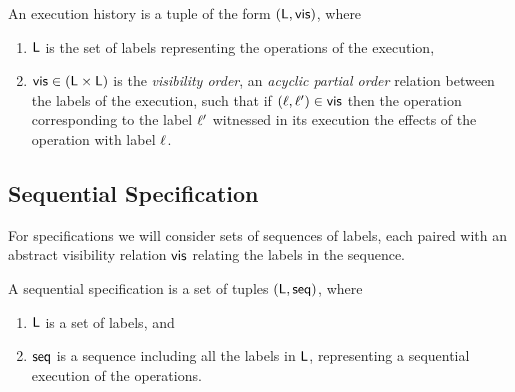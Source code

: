 \begin{definition}[histories]
  \label{definition:histories} An execution history is a tuple of the form
  $(\mathsf{L}, \mathsf{vis})$, where
  \begin{enumerate}
  \item $\mathsf{L}$ is the set of labels representing the operations of
    the execution,
  \item $\mathsf{vis} \in (\mathsf{L} \times \mathsf{L})$ is the
    \emph{visibility order}, an \emph{acyclic partial order}
    relation between the labels of the execution, such that if $(\ell,
    \ell') \in \mathsf{vis}$ then the operation corresponding to the label
    $\ell'$ witnessed in its execution the effects of the operation
    with label $\ell$.
  \end{enumerate}
\end{definition}

\subsection{Sequential Specification}
\label{subsec:sequential specification}

For specifications we will consider sets of sequences of labels, each
paired with an abstract visibility relation $\mathsf{vis}$ relating the
labels in the sequence.


\begin{definition}
  \label{definition:sequential specification} A sequential
  specification is a set of tuples $(\mathsf{L}, \mathsf{seq})$, where
  \begin{enumerate}
  \item $\mathsf{L}$ is a set of labels, and
  \item $\mathsf{seq}$ is a sequence including all the labels in $\mathsf{L}$,
    representing a sequential execution of the operations.
  \end{enumerate}
\end{definition}

